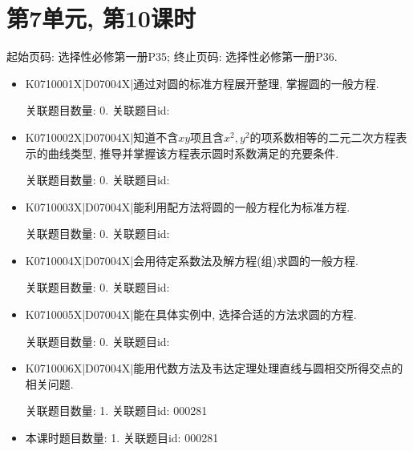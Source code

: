 \section*{第7单元, 第10课时}
起始页码: 选择性必修第一册P35; 终止页码: 选择性必修第一册P36.
\begin{itemize}
\item K0710001X|D07004X|通过对圆的标准方程展开整理, 掌握圆的一般方程.

关联题目数量: 0. 关联题目id: 

\item K0710002X|D07004X|知道不含$xy$项且含$x^2, y^2$的项系数相等的二元二次方程表示的曲线类型, 推导并掌握该方程表示圆时系数满足的充要条件.

关联题目数量: 0. 关联题目id: 

\item K0710003X|D07004X|能利用配方法将圆的一般方程化为标准方程.

关联题目数量: 0. 关联题目id: 

\item K0710004X|D07004X|会用待定系数法及解方程(组)求圆的一般方程.

关联题目数量: 0. 关联题目id: 

\item K0710005X|D07004X|能在具体实例中, 选择合适的方法求圆的方程.

关联题目数量: 0. 关联题目id: 

\item K0710006X|D07004X|能用代数方法及韦达定理处理直线与圆相交所得交点的相关问题.

关联题目数量: 1. 关联题目id: 000281

\item 本课时题目数量: 1. 关联题目id: 000281

\end{itemize}


